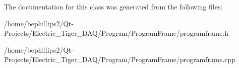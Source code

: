 The documentation for this class was generated from the following files\+:\begin{DoxyCompactItemize}
\item 
/home/bephillips2/\+Qt-\/\+Projects/\+Electric\+\_\+\+Tiger\+\_\+\+D\+A\+Q/\+Program/\+Program\+Frame/programframe.\+h\item 
/home/bephillips2/\+Qt-\/\+Projects/\+Electric\+\_\+\+Tiger\+\_\+\+D\+A\+Q/\+Program/\+Program\+Frame/programframe.\+cpp\end{DoxyCompactItemize}
